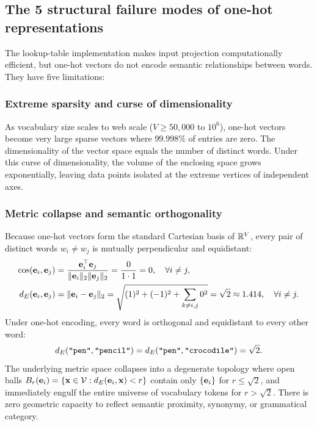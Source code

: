 \documentclass[../../main.tex]{subfiles}
\begin{document}
\subsection{The 5 structural failure modes of one-hot representations}
\label{subsec:five_failure_modes}

The lookup-table implementation makes input projection computationally efficient, but one-hot vectors do not encode semantic relationships between words. They have five limitations:

\subsubsection{Extreme sparsity and curse of dimensionality}
As vocabulary size scales to web scale ($V \ge 50{,}000$ to $10^6$), one-hot vectors become very large sparse vectors where $99.998\%$ of entries are zero. The dimensionality of the vector space equals the number of distinct words. Under this curse of dimensionality, the volume of the enclosing space grows exponentially, leaving data points isolated at the extreme vertices of independent axes.

\subsubsection{Metric collapse and semantic orthogonality}
Because one-hot vectors form the standard Cartesian basis of $\mathbb{R}^V$, every pair of distinct words $w_i \neq w_j$ is mutually perpendicular and equidistant:
\begin{align}
\label{eq:onehot_cosine}
\cos(\mathbf{e}_i, \mathbf{e}_j) &= \frac{\mathbf{e}_i^\top \mathbf{e}_j}{\|\mathbf{e}_i\|_2 \|\mathbf{e}_j\|_2} = \frac{0}{1 \cdot 1} = 0, \quad \forall i \neq j, \\
\label{eq:onehot_l2}
d_E(\mathbf{e}_i, \mathbf{e}_j) &= \|\mathbf{e}_i - \mathbf{e}_j\|_2 = \sqrt{(1)^2 + (-1)^2 + \sum_{k \neq i, j} 0^2} = \sqrt{2} \approx 1.414, \quad \forall i \neq j.
\end{align}
Under one-hot encoding, every word is orthogonal and equidistant to every other word:
\begin{equation}
\label{eq:equidistance_paradox}
d_E(\text{\texttt{"pen"}}, \text{\texttt{"pencil"}}) = d_E(\text{\texttt{"pen"}}, \text{\texttt{"crocodile"}}) = \sqrt{2}.
\end{equation}
The underlying metric space collapses into a degenerate topology where open balls $B_r(\mathbf{e}_i) = \{\mathbf{x} \in \mathcal{V} : d_E(\mathbf{e}_i, \mathbf{x}) < r\}$ contain only $\{\mathbf{e}_i\}$ for $r \le \sqrt{2}$, and immediately engulf the entire universe of vocabulary tokens for $r > \sqrt{2}$. There is zero geometric capacity to reflect semantic proximity, synonymy, or grammatical category.
\end{document}
